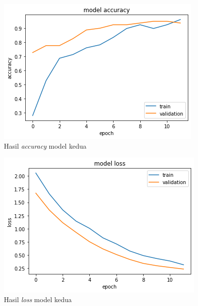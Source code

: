 \begin{figure}[H]
  \centering

  \includegraphics[scale=0.75]{gambar/bab4-uji-model-second-acc.png}

  \caption{Hasil \emph{accuracy} model kedua}
  \label{fig:model2-train-acc}
\end{figure}

\begin{figure}[H]
  \centering

  \includegraphics[scale=0.75]{gambar/bab4-uji-model-second-loss.png}

  \caption{Hasil \emph{loss} model kedua}
  \label{fig:model2-train-loss}
\end{figure}


